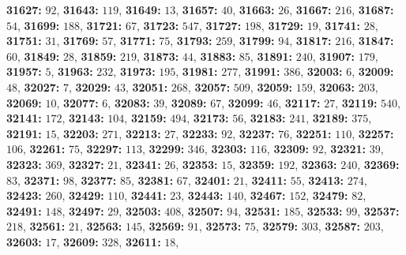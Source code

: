 \textsf{\bfseries 31627:} $92$, \textsf{\bfseries 31643:} $119$, \textsf{\bfseries 31649:} $13$, \textsf{\bfseries 31657:} $40$, \textsf{\bfseries 31663:} $26$, \textsf{\bfseries 31667:} $216$, \textsf{\bfseries 31687:} $54$, \textsf{\bfseries 31699:} $188$, \textsf{\bfseries 31721:} $67$, \textsf{\bfseries 31723:} $547$, \textsf{\bfseries 31727:} $198$, \textsf{\bfseries 31729:} $19$, \textsf{\bfseries 31741:} $28$, \textsf{\bfseries 31751:} $31$, \textsf{\bfseries 31769:} $57$, \textsf{\bfseries 31771:} $75$, \textsf{\bfseries 31793:} $259$, \textsf{\bfseries 31799:} $94$, \textsf{\bfseries 31817:} $216$, \textsf{\bfseries 31847:} $60$, \textsf{\bfseries 31849:} $28$, \textsf{\bfseries 31859:} $219$, \textsf{\bfseries 31873:} $44$, \textsf{\bfseries 31883:} $85$, \textsf{\bfseries 31891:} $240$, \textsf{\bfseries 31907:} $179$, \textsf{\bfseries 31957:} $5$, \textsf{\bfseries 31963:} $232$, \textsf{\bfseries 31973:} $195$, \textsf{\bfseries 31981:} $277$, \textsf{\bfseries 31991:} $386$, \textsf{\bfseries 32003:} $6$, \textsf{\bfseries 32009:} $48$, \textsf{\bfseries 32027:} $7$, \textsf{\bfseries 32029:} $43$, \textsf{\bfseries 32051:} $268$, \textsf{\bfseries 32057:} $509$, \textsf{\bfseries 32059:} $159$, \textsf{\bfseries 32063:} $203$, \textsf{\bfseries 32069:} $10$, \textsf{\bfseries 32077:} $6$, \textsf{\bfseries 32083:} $39$, \textsf{\bfseries 32089:} $67$, \textsf{\bfseries 32099:} $46$, \textsf{\bfseries 32117:} $27$, \textsf{\bfseries 32119:} $540$, \textsf{\bfseries 32141:} $172$, \textsf{\bfseries 32143:} $104$, \textsf{\bfseries 32159:} $494$, \textsf{\bfseries 32173:} $56$, \textsf{\bfseries 32183:} $241$, \textsf{\bfseries 32189:} $375$, \textsf{\bfseries 32191:} $15$, \textsf{\bfseries 32203:} $271$, \textsf{\bfseries 32213:} $27$, \textsf{\bfseries 32233:} $92$, \textsf{\bfseries 32237:} $76$, \textsf{\bfseries 32251:} $110$, \textsf{\bfseries 32257:} $106$, \textsf{\bfseries 32261:} $75$, \textsf{\bfseries 32297:} $113$, \textsf{\bfseries 32299:} $346$, \textsf{\bfseries 32303:} $116$, \textsf{\bfseries 32309:} $92$, \textsf{\bfseries 32321:} $39$, \textsf{\bfseries 32323:} $369$, \textsf{\bfseries 32327:} $21$, \textsf{\bfseries 32341:} $26$, \textsf{\bfseries 32353:} $15$, \textsf{\bfseries 32359:} $192$, \textsf{\bfseries 32363:} $240$, \textsf{\bfseries 32369:} $83$, \textsf{\bfseries 32371:} $98$, \textsf{\bfseries 32377:} $85$, \textsf{\bfseries 32381:} $67$, \textsf{\bfseries 32401:} $21$, \textsf{\bfseries 32411:} $55$, \textsf{\bfseries 32413:} $274$, \textsf{\bfseries 32423:} $260$, \textsf{\bfseries 32429:} $110$, \textsf{\bfseries 32441:} $23$, \textsf{\bfseries 32443:} $140$, \textsf{\bfseries 32467:} $152$, \textsf{\bfseries 32479:} $82$, \textsf{\bfseries 32491:} $148$, \textsf{\bfseries 32497:} $29$, \textsf{\bfseries 32503:} $408$, \textsf{\bfseries 32507:} $94$, \textsf{\bfseries 32531:} $185$, \textsf{\bfseries 32533:} $99$, \textsf{\bfseries 32537:} $218$, \textsf{\bfseries 32561:} $21$, \textsf{\bfseries 32563:} $145$, \textsf{\bfseries 32569:} $91$, \textsf{\bfseries 32573:} $75$, \textsf{\bfseries 32579:} $303$, \textsf{\bfseries 32587:} $203$, \textsf{\bfseries 32603:} $17$, \textsf{\bfseries 32609:} $328$, \textsf{\bfseries 32611:} $18$, 
